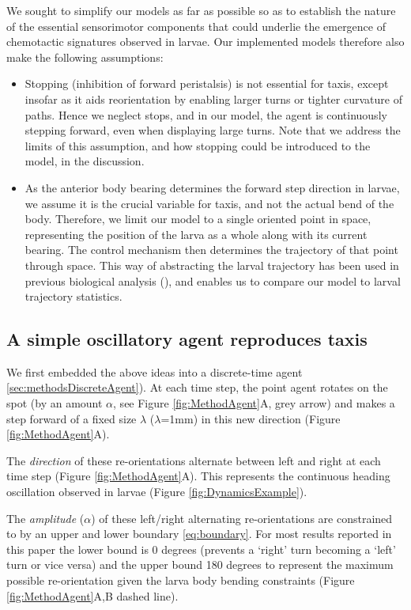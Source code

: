 \documentclass[11pt,a4paper]{article}
\begin{document}
We sought to simplify our models as far as possible so as to establish the nature of the essential sensorimotor components that could underlie the emergence of chemotactic signatures observed in larvae. Our implemented models therefore also make the following assumptions:

\begin{itemize}

\item Stopping (inhibition of forward peristalsis) is not essential for taxis, except insofar as it aids reorientation by enabling larger turns or tighter curvature of paths. Hence we neglect stops, and in our model, the agent is continuously stepping forward, even when displaying large turns. Note that we address the limits of this assumption, and how stopping could be introduced to the model, in the discussion.

\item As the anterior body bearing determines the forward step direction in larvae, we assume it is the crucial variable for taxis, and not the actual bend of the body. Therefore, we limit our model to a single oriented point in space, representing the position of the larva as a whole along with its current bearing. The control mechanism then determines the trajectory of that point through space. 
This way of abstracting the larval trajectory has been used in previous biological analysis (\citep{louis2008bilateral}), and enables us to compare our model to larval trajectory statistics. 

\end{itemize}

\subsection{A simple oscillatory agent reproduces taxis}

We first embedded the above ideas into a discrete-time agent \ref{sec:methodsDiscreteAgent}). At each time step, the point agent rotates on the spot (by an amount $\alpha$, see Figure \ref{fig:MethodAgent}A, grey arrow) and makes a step forward of a fixed size $\lambda$ ($\lambda$=1mm) in this new direction (Figure \ref{fig:MethodAgent}A).

The {\it direction} of these re-orientations alternate between left and right at each time step (Figure \ref{fig:MethodAgent}A). This represents the continuous heading oscillation observed in larvae (Figure \ref{fig:DynamicsExample}).  

The {\it amplitude} ($\alpha$) of these left/right alternating re-orientations are constrained to by an upper and lower boundary \eqref{eq:boundary}. For most results reported in this paper the lower bound is 0 degrees (prevents a `right' turn becoming a `left' turn or vice versa) and the upper bound 180 degrees to represent the maximum possible re-orientation given the larva body bending constraints (Figure \ref{fig:MethodAgent}A,B dashed line).
\end{document}
